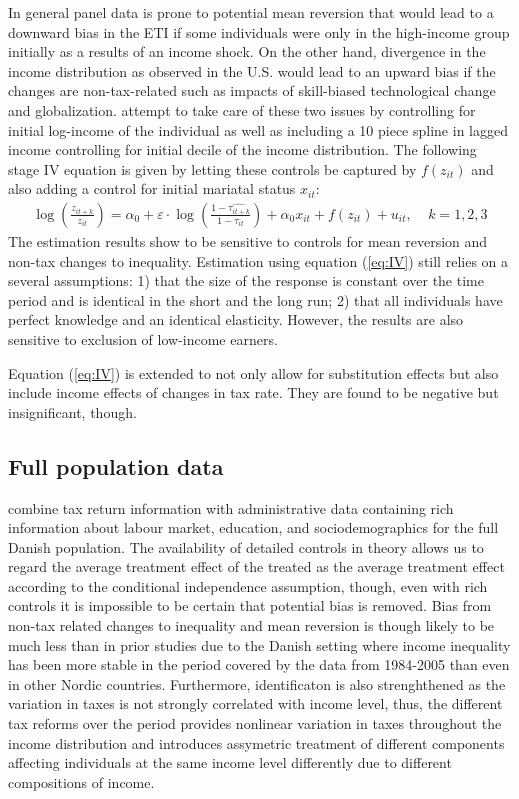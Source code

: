 In general panel data is prone to potential mean reversion that would lead to a downward bias in the ETI if some individuals were only in the high-income group initially as a results of an income shock. On the other hand, divergence in the income distribution as observed in the U.S. \citep{gruber2002elasticity} would lead to an upward bias if the changes are non-tax-related such as impacts of skill-biased technological change and globalization. \citet{gruber2002elasticity} attempt to take care of these two issues by controlling for initial log-income of the individual as well as including a 10 piece spline in lagged income controlling for initial decile of the income distribution. The following  stage IV equation is given by letting these controls be captured by $f(z_{it})$ and also adding a control for initial mariatal status $x_{it}$:
\begin{align}
  \log\left(\frac{z_{it+k}}{z_{it}}\right)=\alpha_0 +\varepsilon\cdot \log\left(\frac{1-\hat{\tau_{it+k}}}{1-\tau_{it}}\right) + \alpha_0 x_{it} + f(z_{it}) + u_{it},\ \ \ \ \ k=1,2,3
  \label{eq:IV}
\end{align}
The estimation results show to be sensitive to controls for mean reversion and non-tax changes to inequality. Estimation using equation (\ref{eq:IV}) still relies on a several assumptions: 1) that the size of the response is constant over the time period and is identical in the short and the long run; 2) that all individuals have perfect knowledge and an identical elasticity. However, the results are also sensitive to exclusion of low-income earners.

Equation (\ref{eq:IV}) is extended to not only allow for substitution effects but also include income effects of changes in tax rate. They are found to be negative but insignificant, though.

\subsection{Full population data}
\citet{kleven2014estimating} combine tax return information with administrative data containing rich information about labour market, education, and sociodemographics for the full Danish population. The availability of detailed controls in theory allows us to regard the average treatment effect of the treated as the average treatment effect according to the conditional independence assumption, though, even with rich controls it is impossible to be certain that potential bias is removed. Bias from non-tax related changes to inequality and mean reversion is though likely to be much less than in prior studies due to the Danish setting where income inequality has been more stable in the period covered by the data from 1984-2005 than even in other Nordic countries. Furthermore, identificaton is also strenghthened as the variation in taxes is not strongly correlated with income level, thus, the different tax reforms over the period provides nonlinear variation in taxes throughout the income distribution and introduces assymetric treatment of different components affecting individuals at the same income level differently due to different compositions of income.


